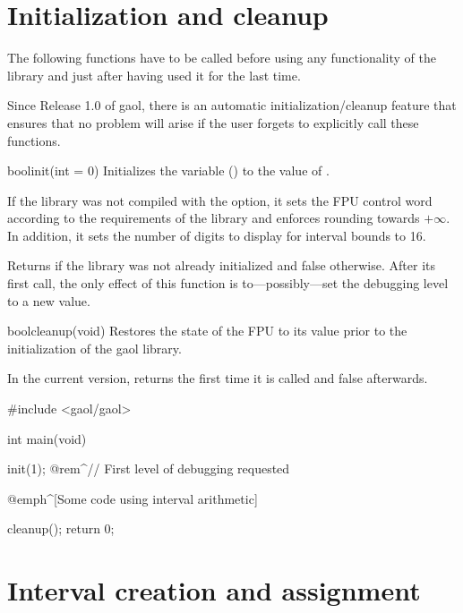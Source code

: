 \documentclass{manual}
\begin{document}
\chapter{Initialization and cleanup}

The following functions have to be called before using any functionality of
the library and just after having used it for the last time.

Since Release 1.0 of gaol, there is an automatic
initialization/cleanup feature that ensures that no problem will
arise if the user forgets to explicitly call these functions.

\begin{deffun}{bool}{init}{(int  = 0)}
Initializes the variable  () to the
value of .

If the library was not compiled with the
 option, it sets the FPU control
word according to the requirements of the  library and
enforces rounding towards $+\infty$.
In addition, it sets the number of digits to display for interval bounds to 16.

Returns  if the library was not already initialized and false otherwise. After its first
call, the only effect of this function is to---possibly---set the debugging level to a new value.
\end{deffun}

\begin{deffun}{bool}{cleanup}{(void)}
Restores the state of the FPU to its value prior to the initialization of the
gaol library.

In the current version, returns  the first time it is called and false afterwards.
\end{deffun}


\begin{example}
#include <gaol/gaol>

int main(void)
{
  init(1); @rem^// First level of debugging requested~

  @emph^[Some code using interval arithmetic]~

  cleanup();
  return 0;
}
\end{example}

\chapter{Interval creation and assignment}
\end{document}
